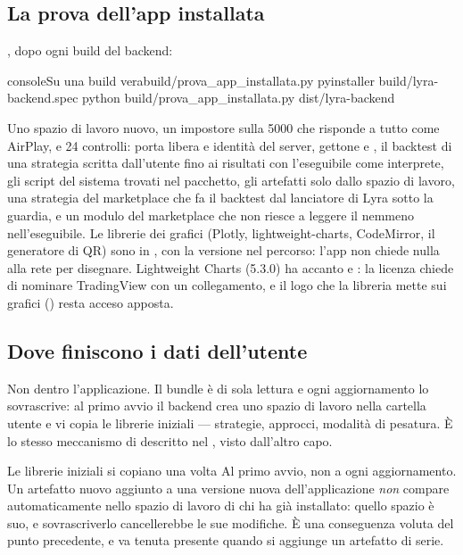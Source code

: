 \subsection{La prova dell'app installata}

, dopo ogni build del backend:

\begin{codiceInterno}{console}{Su una build vera}{build/prova\_app\_installata.py}
pyinstaller build/lyra-backend.spec
python build/prova_app_installata.py dist/lyra-backend
\end{codiceInterno}

\noindent
Uno spazio di lavoro nuovo, un impostore sulla \num{5000} che risponde
 a tutto come AirPlay, e \num{24} controlli: porta libera e
identità del server, gettone e , il backtest di una strategia
scritta dall'utente fino ai risultati con l'eseguibile come interprete, gli
script del sistema trovati nel pacchetto, gli artefatti solo dallo spazio di
lavoro, una strategia del marketplace che fa il backtest dal lanciatore di
Lyra sotto la guardia, e un modulo del marketplace che non riesce a leggere
il \mbox{} nemmeno nell'eseguibile. Le librerie dei grafici (Plotly,
lightweight-charts, CodeMirror, il generatore di QR) sono in
, con la versione nel percorso: l'app non
chiede nulla alla rete per disegnare. Lightweight Charts (5.3.0) ha
accanto  e : la licenza chiede di nominare
TradingView con un collegamento, e il logo che la libreria mette sui grafici
() resta acceso apposta.

\subsection{Dove finiscono i dati dell'utente}

Non dentro l'applicazione. Il bundle è di sola lettura e ogni aggiornamento
lo sovrascrive: al primo avvio il backend crea uno spazio di lavoro nella
cartella utente e vi copia le librerie iniziali --- strategie, approcci,
modalità di pesatura. È lo stesso meccanismo di 
descritto nel , visto dall'altro capo.

\begin{attenzione}{Le librerie iniziali si copiano una volta}
Al primo avvio, non a ogni aggiornamento. Un artefatto nuovo aggiunto a una
versione nuova dell'applicazione \emph{non} compare automaticamente nello
spazio di lavoro di chi ha già installato: quello spazio è suo, e
sovrascriverlo cancellerebbe le sue modifiche. È una conseguenza voluta del
punto precedente, e va tenuta presente quando si aggiunge un artefatto di
serie.
\end{attenzione}

